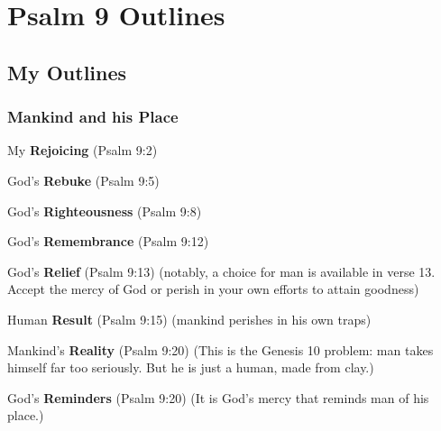 \section{Psalm 9 Outlines}

\subsection{My Outlines}

\subsubsection{Mankind and his Place}


\begin{compactenum}[I.]
    \item My \textbf{Rejoicing} (Psalm 9:2)
    \item God's \textbf{Rebuke} (Psalm 9:5)
    \item God's \textbf{Righteousness} (Psalm 9:8)
    \item God's \textbf{Remembrance} (Psalm 9:12)
    \item God's \textbf{Relief} (Psalm 9:13) (notably, a choice for man is available in verse 13.  Accept the mercy of God or perish in your own efforts to attain goodness)
    \item Human \textbf{Result} (Psalm 9:15) (mankind perishes in his own traps)
    \item Mankind's \textbf{Reality} (Psalm 9:20) (This is the Genesis 10 problem: man takes himself far too seriously. But he is just a human, made from  clay.)
    \item God's \textbf{Reminders} (Psalm 9:20) (It is God's mercy that reminds man of his place.)
\end{compactenum}

